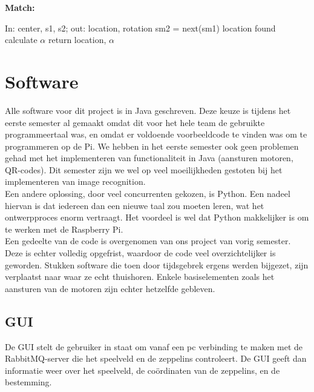 \documentclass[eind]{penoverslag}
\begin{document}
\textbf{Match:}
\begin{algorithmic}
\STATE In: center, s1, s2; out: location, rotation
				\STATE sm2 = next(sm1)
					\STATE location found
					\STATE calculate $\alpha$
					\STATE return location, $\alpha$
				\ENDIF
			\ENDFOR
		\ENDIF
	\ENDFOR
\end{algorithmic}




\section{Software}

Alle software voor dit project is in Java geschreven. Deze keuze is tijdens het eerste semester al gemaakt omdat dit voor het hele team de gebruikte programmeertaal was, en omdat er voldoende voorbeeldcode te vinden was om te programmeren op de Pi. We hebben in het eerste semester ook geen problemen gehad met het implementeren van functionaliteit in Java (aansturen motoren, QR-codes). Dit semester zijn we wel op veel moeilijkheden gestoten bij het implementeren van image recognition. \\
Een andere oplossing, door veel concurrenten gekozen, is Python. Een nadeel hiervan is dat iedereen dan een nieuwe taal zou moeten leren, wat het ontwerpproces enorm vertraagt. Het voordeel is wel dat Python makkelijker is om te werken met de Raspberry Pi. \\ 

Een gedeelte van de code is overgenomen van ons project van vorig semester. Deze is echter volledig opgefrist, waardoor de code veel overzichtelijker is geworden. Stukken software die toen door tijdsgebrek ergens werden bijgezet, zijn verplaatst naar waar ze echt thuishoren. Enkele basiselementen zoals het aansturen van de motoren zijn echter hetzelfde gebleven.\\

\subsection{GUI}
De GUI stelt de gebruiker in staat om vanaf een pc verbinding te maken met de RabbitMQ-server die het speelveld en de zeppelins controleert. De GUI geeft dan informatie weer over het speelveld, de co\"{o}rdinaten van de zeppelins, en de bestemming. \\
\end{document}
